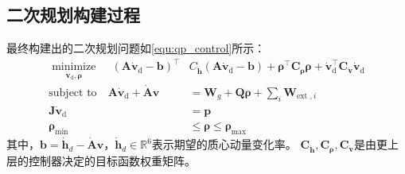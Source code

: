 \subsection{二次规划构建过程}
最终构建出的二次规划问题如\ref{equ:qp_control}所示：
\begin{equation}
    \label{equ:qp_control}
    \begin{aligned}
       \underset{{{{\dot{\boldsymbol{v}}}}_{\text{d}}},\boldsymbol{\rho}}{\mathop{\operatorname{minimize}}}\,\quad {{\left( \boldsymbol{A}{{{\dot{\boldsymbol{v}}}}_{\text{d}}}-\boldsymbol{b} \right)}^{\top }}&{{C}_{{\dot{\boldsymbol{h}}}}}\left( \boldsymbol{A}{{{\dot{\boldsymbol{v}}}}_{\text{d}}}-\boldsymbol{b} \right)+{{\boldsymbol{\rho} }^{\top }}{{\boldsymbol{C}}_{\boldsymbol{\rho} }}\boldsymbol{\rho} +\dot{\boldsymbol{v}}_{\text{d}}^{\top }{{\boldsymbol{C}}_{{\dot{\boldsymbol{v}}}}}{{{\dot{\boldsymbol{v}}}}_{\text{d}}} \\ 
        \text{subject to}\quad \boldsymbol{A}{{{\dot{\boldsymbol{v}}}}_{\text{d}}}+\dot{\boldsymbol{A}}\boldsymbol{v}&={\boldsymbol{{}W}_{g}}+\boldsymbol{Q}\boldsymbol{\rho} +\sum\limits_{i}{{{\boldsymbol{W}}_{\text{ext },i}}} \\ 
        \boldsymbol{J}{{{\dot{\boldsymbol{v}}}}_{\text{d}}}&=\boldsymbol{p} \\ 
        {{\boldsymbol{\rho} }_{\min }}&\le \boldsymbol{\rho} \le {{\boldsymbol{\rho} }_{\max }} 
      \end{aligned}
\end{equation}
其中，$\boldsymbol{b}={{\dot{\boldsymbol{h}}}_{d}}-\dot{\boldsymbol{A}}\boldsymbol{v}$，${{\dot{\boldsymbol{h}}}_{d}}\in {{\mathbb{R}}^{6}}$表示期望的质心动量变化率。
${{\boldsymbol{C}}_{{\dot{\boldsymbol{h}}}}},{\boldsymbol{{C}}_{\boldsymbol{\rho} }},{\boldsymbol{C}_{{\dot{\boldsymbol{v}}}}}$是由更上层的控制器决定的目标函数权重矩阵。

